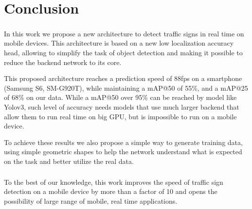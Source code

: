 \chapter{Conclusion}

\paragraph{}
In this work we propose a new architecture to detect traffic signs in real time on mobile devices. This architecture is based on a new low localization accuracy head, allowing to simplify the task of object detection and making it possible to reduce the backend network to its core.

This proposed architecture reaches a prediction speed of 88fps on a smartphone (Samsung S6, SM-G920T), while maintaining a mAP@50 of 55\%, and a mAP@25 of 68\% on our data. While a mAP@50 over 95\% can be reached by model like Yolov3, such level of accuracy needs models that use much larger backend that allow them to run real time on big GPU, but is impossible to run on a mobile device.

To achieve these results we also propose a simple way to generate training data, using simple geometric shapes to help the network understand what is expected on the task and better utilize the real data.

\paragraph{}
To the best of our knowledge, this work improves the speed of traffic sign detection on a mobile device by more than a factor of 10 and opens the possibility of large range of mobile, real time applications.

